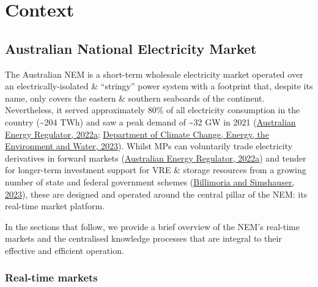 \documentclass[12pt,a4paper,]{report}
\begin{document}
\hypertarget{sec:info-context}{%
\section{Context}\label{sec:info-context}}

\hypertarget{sec:info-context-nem}{%
\subsection{Australian National Electricity
Market}\label{sec:info-context-nem}}

The Australian NEM is a short-term wholesale electricity market operated
over an electrically-isolated \& ``stringy'' power system with a
footprint that, despite its name, only covers the eastern \& southern
seaboards of the continent. Nevertheless, it served approximately 80\%
of all electricity consumption in the country (\textasciitilde204 TWh)
and saw a peak demand of \textasciitilde32 GW in 2021
(\protect\hyperlink{ref-australianenergyregulatorStateEnergyMarket2022}{Australian
Energy Regulator, 2022a};
\protect\hyperlink{ref-departmentofclimatechangeenergytheenvironmentandwaterNationalElectricityMarket2023}{Department
of Climate Change, Energy, the Environment and Water, 2023}). Whilst MPs
can voluntarily trade electricity derivatives in forward markets
(\protect\hyperlink{ref-australianenergyregulatorStateEnergyMarket2022}{Australian
Energy Regulator, 2022a}) and tender for longer-term investment support
for VRE \& storage resources from a growing number of state and federal
government schemes
(\protect\hyperlink{ref-billimoriaContractDesignStorage2023a}{Billimoria
and Simshauser, 2023}), these are designed and operated around the
central pillar of the NEM: its real-time market platform.

In the sections that follow, we provide a brief overview of the NEM's
real-time markets and the centralised knowledge processes that are
integral to their effective and efficient operation.

\hypertarget{sec:info-context-nem-rtm}{%
\subsubsection{Real-time markets}\label{sec:info-context-nem-rtm}}
\end{document}
